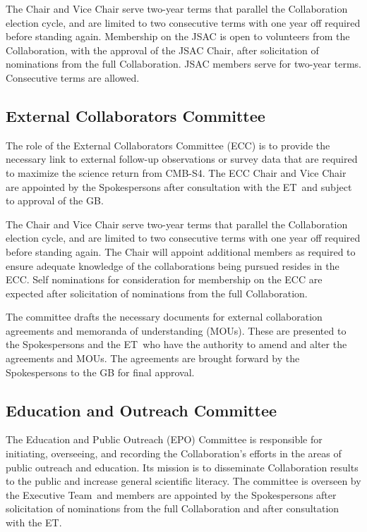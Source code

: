 \documentclass[12pt]{article}
\newcommand{\exec}{{Executive Team}}
\newcommand{\shorte}{{ET}}  %
\newcommand\collabname{CMB-S4}
\begin{document}
The Chair and Vice Chair serve two-year terms that parallel the Collaboration election cycle, and are limited to two consecutive terms with one year off required before standing again. Membership on the JSAC is open to volunteers from the Collaboration, with the approval of the JSAC Chair, after solicitation of nominations from the full Collaboration. JSAC members serve for two-year terms. Consecutive terms are allowed.


\subsection{External Collaborators Committee}

The role of the External Collaborators Committee (ECC) is to provide the necessary link to external follow-up observations or survey data that are required to maximize the science return from \collabname. The ECC Chair and Vice Chair are appointed by the Spokespersons after consultation with the \shorte\ and subject to approval of the GB.

The Chair and Vice Chair serve two-year terms that parallel the Collaboration election cycle, and are limited to two consecutive terms with one year off required before standing again. The Chair will appoint additional members as required to ensure adequate knowledge of the collaborations being pursued resides in the ECC. Self nominations for consideration for membership on the ECC are expected after solicitation of nominations from the full Collaboration.

The committee drafts the necessary documents for external collaboration agreements and memoranda of understanding (MOUs). These are presented to the Spokespersons and the \shorte\ who have the authority to amend and alter the agreements and MOUs. The agreements are brought forward by the Spokespersons to the GB for final approval.

\subsection{Education and Outreach Committee}

The Education and Public Outreach (EPO) Committee is responsible for initiating, overseeing, and recording the Collaboration's efforts in the areas of public outreach and education. Its mission is to disseminate Collaboration results to the public and increase general scientific literacy. The committee is overseen by the \exec \ and members are appointed by the Spokespersons after solicitation of nominations from the full Collaboration and after consultation with the \shorte.
\end{document}
